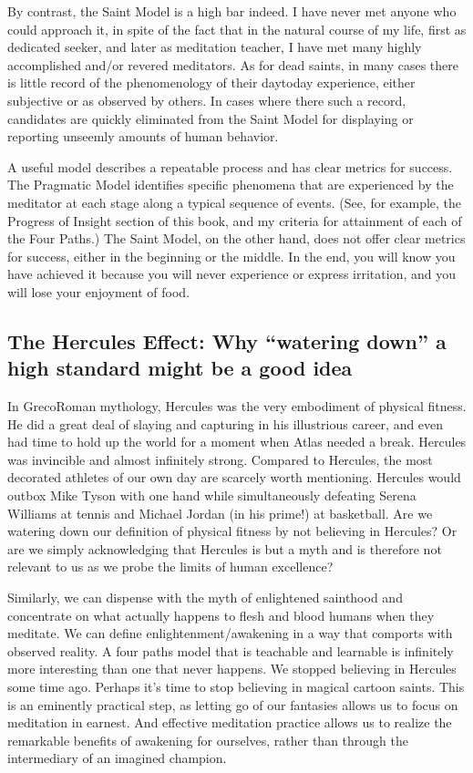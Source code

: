 \documentclass[a5paper,10pt,english]{book}
\begin{document}
\sphinxAtStartPar
By contrast, the Saint Model is a high bar indeed. I have never met
anyone who could approach it, in spite of the fact that in the natural
course of my life, first as dedicated seeker, and later as meditation
teacher, I have met many highly accomplished and/or revered meditators.
As for dead saints, in many cases there is little record of the
phenomenology of their day\sphinxhyphen{}to\sphinxhyphen{}day experience, either subjective or as
observed by others. In cases where there  such a record, candidates
are quickly eliminated from the Saint Model for displaying or reporting
unseemly amounts of human behavior.

\sphinxAtStartPar
A useful model describes a repeatable process and has clear metrics for
success. The Pragmatic Model identifies specific phenomena that are
experienced by the meditator at each stage along a typical sequence of
events. (See, for example, the Progress of Insight section of this book,
and my criteria for attainment of each of the Four Paths.) The Saint
Model, on the other hand, does not offer clear metrics for success,
either in the beginning or the middle. In the end, you will know you
have achieved it because you will never experience or express
irritation, and you will lose your enjoyment of food.


\subsection{The Hercules Effect: Why “watering down” a high standard might be a good idea}
\label{\detokenize{main-2:the-hercules-effect-why-watering-down-a-high-standard-might-be-a-good-idea}}
\sphinxAtStartPar
In Greco\sphinxhyphen{}Roman mythology, Hercules was the very embodiment of physical
fitness. He did a great deal of slaying and capturing in his illustrious
career, and even had time to hold up the world for a moment when Atlas
needed a break. Hercules was invincible and almost infinitely strong.
Compared to Hercules, the most decorated athletes of our own day are
scarcely worth mentioning. Hercules would outbox Mike Tyson with one
hand while simultaneously defeating Serena Williams at tennis and
Michael Jordan (in his prime!) at basketball. Are we watering down our
definition of physical fitness by not believing in Hercules? Or are we
simply acknowledging that Hercules is but a myth and is therefore not
relevant to us as we probe the limits of human excellence?

\sphinxAtStartPar
Similarly, we can dispense with the myth of enlightened sainthood and
concentrate on what actually happens to flesh and blood humans when they
meditate. We can define enlightenment/awakening in a way that comports
with observed reality. A four paths model that is teachable and
learnable is infinitely more interesting than one that never happens. We
stopped believing in Hercules some time ago. Perhaps it’s time to stop
believing in magical cartoon saints. This is an eminently practical
step, as letting go of our fantasies allows us to focus on meditation in
earnest. And effective meditation practice allows us to realize the
remarkable benefits of awakening for ourselves, rather than through the
intermediary of an imagined champion.
\end{document}
